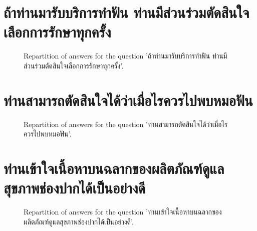 \documentclass[12pt]{article}
\begin{document}
\clearpage{}
\section{ถ้าท่านมารับบริการทำฟัน ท่านมีส่วนร่วมตัดสินใจเลือกการรักษาทุกครั้ง}

\label{sec:96}


\begin{figure}[h!]
    \caption{\label{figure:q96-1}Repartition of answers for the question 'ถ้าท่านมารับบริการทำฟัน ท่านมีส่วนร่วมตัดสินใจเลือกการรักษาทุกครั้ง'.}
\end{figure}



\clearpage{}
\section{ท่านสามารถตัดสินใจได้ว่าเมื่อไรควรไปพบหมอฟัน}

\label{sec:97}


\begin{figure}[h!]
    \caption{\label{figure:q97-1}Repartition of answers for the question 'ท่านสามารถตัดสินใจได้ว่าเมื่อไรควรไปพบหมอฟัน'.}
\end{figure}



\clearpage{}
\section{ท่านเข้าใจเนื้อหาบนฉลากของผลิตภัณฑ์ดูแลสุขภาพช่องปากได้เป็นอย่างดี}

\label{sec:98}


\begin{figure}[h!]
    \caption{\label{figure:q98-1}Repartition of answers for the question 'ท่านเข้าใจเนื้อหาบนฉลากของผลิตภัณฑ์ดูแลสุขภาพช่องปากได้เป็นอย่างดี'.}
\end{figure}
\end{document}
